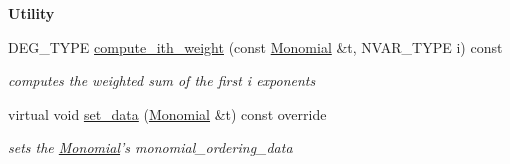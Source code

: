 \begin{Indent}\textbf{ Utility}\par
\begin{DoxyCompactItemize}
\item 
\mbox{\label{group__orderinggroup_a760db9641eb6993748fb26c211bd4bb0}} 
D\+E\+G\+\_\+\+T\+Y\+PE \hyperlink{group__orderinggroup_a760db9641eb6993748fb26c211bd4bb0}{compute\+\_\+ith\+\_\+weight} (const \hyperlink{group__polygroup_class_monomial}{Monomial} \&t, N\+V\+A\+R\+\_\+\+T\+Y\+PE i) const
\begin{DoxyCompactList}\small\item\em computes the weighted sum of the first i exponents \end{DoxyCompactList}\item 
\mbox{\label{group__orderinggroup_a18ba60cd0a76da002303a11d362142d9}} 
virtual void \hyperlink{group__orderinggroup_a18ba60cd0a76da002303a11d362142d9}{set\+\_\+data} (\hyperlink{group__polygroup_class_monomial}{Monomial} \&t) const override
\begin{DoxyCompactList}\small\item\em sets the \hyperlink{group__polygroup_class_monomial}{Monomial}'s {\ttfamily monomial\+\_\+ordering\+\_\+data} \end{DoxyCompactList}\end{DoxyCompactItemize}
\end{Indent}
